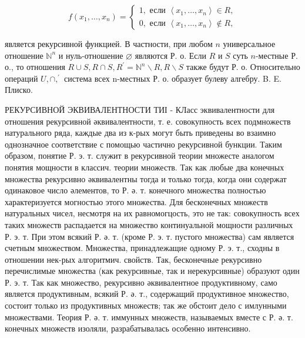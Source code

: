 \documentclass[10pt]{article}
\begin{document}
\[

f\left(x_{1}, \ldots, x_{n}\right)=\left\{\begin{array}{l}

1, \text { если }\left\langle x_{1}, \ldots, x_{n}\right\rangle \in R, \\

0, \text { если }\left\langle x_{1}, \ldots, x_{n}\right\rangle \notin R,

\end{array}\right.

\]



является рекурсивной функцией. В частности, при любом $n$ универсальное отношение $\mathbb{N}^{n}$ и нуль-отношение $\varnothing$ являются Р. о. Если $R$ и $S$ суть $n$-местные Р. о., то отношения $R \cup S, R \cap S, R^{\prime}=\mathbb{N}^{n} \backslash R, R \backslash S$ также будут Р. о. Относительно операций $U, \cap,^{\prime}$ система всех n-местных Р. о. образует булеву алгебру. B. E. Плиско.



РЕКУРСИВНОЙ ЭКВИВАЛЕНТНОСТИ ТИІ - КЛасс эквивалентности для отношения рекурсивной әквивалентности, т. е. совокупность всех подмножеств натурального ряда, каждые два из к-рых могут быть приведены во взаимно однозначное соответствие с помощью частично рекурсивной бункции. Таким образом, понятие Р. э. т. служит в рекурсивной теории множесте аналогом понятия мощности в классич. теории множеств. Так как любые два конечных множества рекурсивно әквивалентны тогда и только тогда, когда они содержат одинаковое число әлементов, то Р. ә. т. конечного множества полностью характеризуется могностью этого множества. Для бесконечных множеств натуральных чисел, несмотря на их равномогцость, это не так: совокупность всех таких множеств распадается на множество континуальной мощности различных Р. э. т. При этом всякий Р. ә. т. (кроме Р. э. т. пустого множества) сам является счетным множеством. Множества, принадлежащие одному Р. э. т., сходны в отношении нек-рых алгоритмич. свойств. Так, бесконечные рекурсивно перечислимые множества (как рекурсивные, так и нерекурсивные) образуют один Р. э. т. Так как множество, рекурсивно әквивалентное продуктивному, само является продуктивным, всякий Р. ә. т., содержащий продуктивное множество, состоит только из продуктивных множеств; так же обстоит дело с имлунными множествами. Теория Р. ә. т. иммунных множеств, называемых вместе с Р. ә. т. конечных множеств изоляли, разрабатывалась особенно интенсивно.
\end{document}
